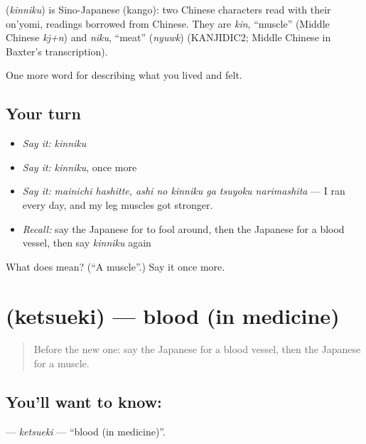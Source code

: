 \begin{cousinweb}
\textbf{} (\emph{kinniku}) is Sino-Japanese (kango): two Chinese characters read with their on'yomi, readings borrowed from Chinese. They are \emph{kin}, \textquotedblleft{}muscle\textquotedblright{} (Middle Chinese \emph{kj+n}) and \emph{niku}, \textquotedblleft{}meat\textquotedblright{} (\emph{nyuwk}) (KANJIDIC2; Middle Chinese in Baxter's transcription).
\end{cousinweb}

\begin{grammarlens}[title={What you've built}]
One more word for describing what you lived and felt.
\end{grammarlens}

\subsection*{Your turn}
\begin{itemize}
\raggedright
  \item \emph{Say it:} \emph{kinniku}
  \item \emph{Say it:} \emph{kinniku}, once more
  \item \emph{Say it:} \emph{mainichi hashitte, ashi no kinniku ga tsuyoku narimashita} — I ran every day, and my leg muscles got stronger.
  \item \emph{Recall:} say the Japanese for to fool around, then the Japanese for a blood vessel, then say \emph{kinniku} again
\end{itemize}

\begin{tcolorbox}[breakable,colback=teal!4,colframe=teal!35!black,title={Before you move on}]
What does  mean? (\textquotedblleft{}A muscle\textquotedblright{}.) Say it once more.
\end{tcolorbox}
\section[\texorpdfstring{\ja{けつえき} (ketsueki)}{けつえき (ketsueki)}]{ (ketsueki) — blood (in medicine)}

\label{lesson:JA-C442-ketsueki}



\begin{quote}
Before the new one: say the Japanese for a blood vessel, then the Japanese for a muscle.
\end{quote}

\subsection*{You'll want to know: }
\textbf{} — \emph{ketsueki} — \textquotedblleft{}blood (in medicine)\textquotedblright{}.

